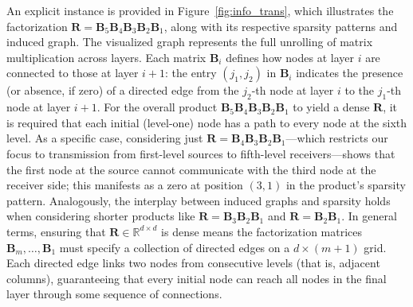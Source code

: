 An explicit instance is provided in Figure~\ref{fig:info_trans}, which illustrates the factorization $\bm{R}=\bm{B}_5\bm{B}_4\bm{B}_3\bm{B}_2\bm{B}_1$, along with its respective sparsity patterns and induced graph. The visualized graph represents the full unrolling of matrix multiplication across layers. Each matrix $\bm{B}_i$ defines how nodes at layer $i$ are connected to those at layer $i+1$: the entry $(j_1, j_2)$ in $\bm{B}_i$ indicates the presence (or absence, if zero) of a directed edge from the $j_2$-th node at layer $i$ to the $j_1$-th node at layer $i+1$. For the overall product $\bm{B}_5\bm{B}_4\bm{B}_3\bm{B}_2\bm{B}_1$ to yield a dense $\bm{R}$, it is required that each initial (level-one) node has a path to every node at the sixth level. As a specific case, considering just $\bm{R}=\bm{B}_4\bm{B}_3\bm{B}_2\bm{B}_1$—which restricts our focus to transmission from first-level sources to fifth-level receivers—shows that the first node at the source cannot communicate with the third node at the receiver side; this manifests as a zero at position $(3,1)$ in the product's sparsity pattern. Analogously, the interplay between induced graphs and sparsity holds when considering shorter products like $\bm{R}=\bm{B}_3\bm{B}_2\bm{B}_1$ and $\bm{R}=\bm{B}_2\bm{B}_1$. In general terms, ensuring that $\bm{R}\in\mathbb{R}^{d\times d}$ is dense means the factorization matrices $\bm{B}_m,\ldots,\bm{B}_1$ must specify a collection of directed edges on a $d\times (m+1)$ grid. Each directed edge links two nodes from consecutive levels (that is, adjacent columns), guaranteeing that every initial node can reach all nodes in the final layer through some sequence of connections.

